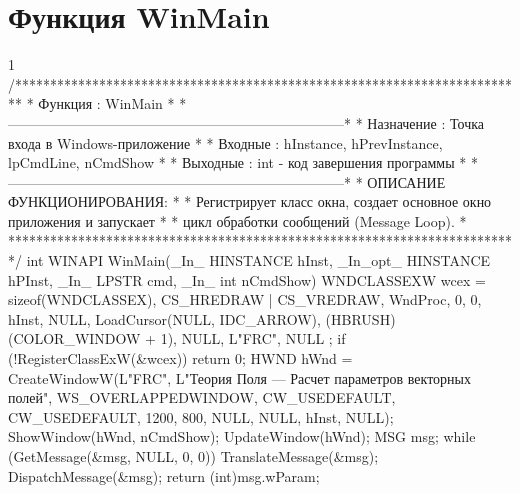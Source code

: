 \section{Функция WinMain}
\footnotesize
\begin{listing}{1}
/*************************************************************************
* Функция       : WinMain                                                *
*------------------------------------------------------------------------*
* Назначение    : Точка входа в Windows-приложение                       *
* Входные       : hInstance, hPrevInstance, lpCmdLine, nCmdShow          *
* Выходные      : int - код завершения программы                         *
*------------------------------------------------------------------------*
* ОПИСАНИЕ ФУНКЦИОНИРОВАНИЯ:                                             *
* Регистрирует класс окна, создает основное окно приложения и запускает  *
* цикл обработки сообщений (Message Loop).                                *
*************************************************************************/
int WINAPI WinMain(_In_ HINSTANCE hInst, _In_opt_ HINSTANCE hPInst, 
                   _In_ LPSTR cmd, _In_ int nCmdShow) {
    WNDCLASSEXW wcex = { sizeof(WNDCLASSEX), CS_HREDRAW | CS_VREDRAW, 
		WndProc, 0, 0, hInst, NULL, LoadCursor(NULL, IDC_ARROW), 
		(HBRUSH)(COLOR_WINDOW + 1), NULL, L"FRC", NULL };
    if (!RegisterClassExW(&wcex)) return 0;
    HWND hWnd = CreateWindowW(L"FRC", 
		L"Теория Поля — Расчет параметров векторных полей", WS_OVERLAPPEDWINDOW,
		CW_USEDEFAULT, CW_USEDEFAULT, 1200, 800, NULL, NULL, hInst, NULL);                     
    ShowWindow(hWnd, nCmdShow); UpdateWindow(hWnd); MSG msg; 
    while (GetMessage(&msg, NULL, 0, 0)) { 
        TranslateMessage(&msg); DispatchMessage(&msg); 
    }
    return (int)msg.wParam;
}
\end{listing}
\normalsize

\pagebreak

